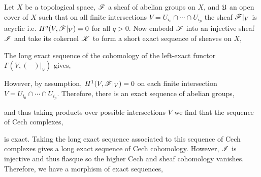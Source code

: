 \documentclass[12pt]{article}
\begin{document}
Let $X$ be a topological space, $\mathscr{F}$ a sheaf of abelian groups on $X$, and $\mathfrak{U}$ an open cover of $X$ such that on all finite intersections $V = U_{i_0} \cap \cdots \cap U_{i_p}$ the sheaf $\mathscr{F}|_V$ is acyclic i.e. $H^q(V, \mathscr{F}|_V) = 0$ for all $q > 0$. Now embedd $\mathscr{F}$ into an injective sheaf $\mathscr{I}$ and take its cokernel $\mathscr{K}$ to form a short exact sequence of sheaves on $X$,
\begin{center}
\end{center}
The long exact sequence of the cohomology of the left-exact functor $\Gamma(V, (-)|_V)$ gives,
\begin{center}
\end{center} 
However, by assumption, $H^1(V, \mathscr{F}|_V) = 0$ on each finite intersection $V = U_{i_0} \cap \cdots \cap U_{i_p}$. Therefore, there is an exact sequence of abelian groups,
\begin{center}
\end{center} 
and thus taking products over possible intersections $V$ we find that the sequence of Cech complexes,
\begin{center}
\end{center}
is exact. Taking the long exact sequence associated to this sequence of Cech complexes gives a long exact sequence of Cech cohomology. However, $\mathscr{I}$ is injective and thus flasque so the higher Cech and sheaf cohomology vanishes. Therefore, we have a morphism of exact sequences,
\begin{center}
\end{center}
\end{document}
